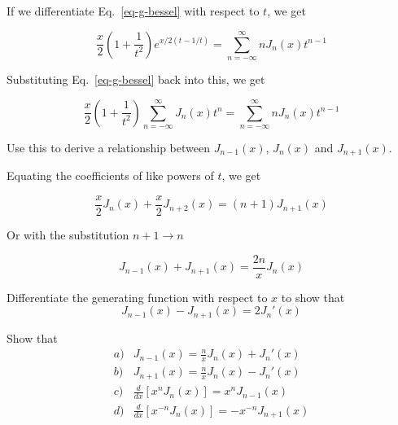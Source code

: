 If we differentiate Eq.~\ref{eq-g-bessel} with respect to $t$, we get

\begin{equation}
\frac{x}{2}\left({1 + \frac{1}{t^2}}\right) e^{x/2(t-1/t)} = \sum_{n = - \infty}^{\infty} n J_n(x)t^{n-1}
\end{equation}

Substituting Eq.~\ref{eq-g-bessel} back into this, we get

\begin{equation}
\frac{x}{2}\left({1 + \frac{1}{t^2}}\right) \sum_{n = - \infty}^{\infty} J_n(x)t^n = \sum_{n = - \infty}^{\infty} n J_n(x)t^{n-1}
\end{equation}

\begin{cue}
Use this to derive a relationship between $J_{n-1}(x)$, $J_{n}(x)$ and  $J_{n+1}(x)$. 
\end{cue}

\noindent{}Equating the coefficients of like powers of $t$, we get

\begin{equation}
\frac{x}{2} J_n(x) + \frac{x}{2} J_{n+2}(x) = (n+1)J_{n+1}(x)
\end{equation} 

Or with the substitution $n+1 \to n$

\begin{equation}
J_{n-1}(x) + J_{n+1}(x) = \frac{2n}{x} J_n(x)
\end{equation} 

\begin{exer}
Differentiate the generating function with respect to $x$ to show that
$$ J_{n-1}(x) - J_{n+1}(x) = 2 J_n'(x)$$ \label{ex-recur}
\end{exer}


\begin{exer}
Show that
$$\begin{array}{lcll}a) & J_{n-1}(x) = \frac{n}{x}J_n(x) + J_n'(x) \\b) & J_{n+1}(x) = \frac{n}{x}J_n(x) - J_n'(x) \\c) & \frac{d}{dx}\left[x^n J_n(x)\right] = x^n J_{n-1}(x) \\d) & \frac{d}{dx}\left[x^{-n} J_n(x)\right] = -x^{-n} J_{n+1}(x)\end{array}$$ \label{ex-recurrence}
\end{exer}

